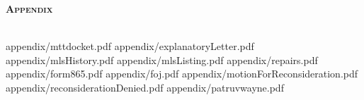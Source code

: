 \documentclass[12pt,\documentclassflag]{article}
\begin{document}
\newpage 

\begin{centering}
  \bf\scshape Appendix \\~\\
  \rm 
\end{centering}

\tableofcontents
\newpage
\renewcommand{\footrulewidth}{0.4pt}
\renewcommand{\subsectionmark}[1]{\markright{/#1}} %

\newcommand{\addLabelsToAllIncludedPages}[1]{%
   \refstepcounter{includepdfpage}%
   \stepcounter{currentpagecounter}%
   \label{#1.\thecurrentpagecounter}}%

\newcommand{\myincludepdf}[2]{%
  \setcounter{currentpagecounter}{0}%
  {appendix/#1.pdf}}%
  
\renewcommand{\sectionmark}[1]{\markboth{#1}{}} %
\myincludepdf{mttdocket}{1,section, 1, Tax Tribunal Docket}
\renewcommand{\sectionmark}[1]{\markboth{#1}{/Explanatory Letter}} %
\myincludepdf{explanatoryLetter}{1,section,1,Submitted Evidence,evidence,1,subsection,2,Explanatory Letter}
\myincludepdf{mlsHistory}{1,subsection,2,MLS History}
\myincludepdf{mlsListing}{1,subsection,2,MLS Listing Sheet}
\myincludepdf{repairs}{1,subsection,2,List of Repairs}
\myincludepdf{form865}{1,subsection,2,Form 865 Mathieu Gast Nonconsideration}
\renewcommand{\sectionmark}[1]{\markboth{#1}{}} %
\myincludepdf{foj}{1,section,1,Final Opinion and Judgement}
\myincludepdf{motionForReconsideration}{1,section,1,Motion For Reconsideration}
\myincludepdf{reconsiderationDenied}{1,section,1,Reconsideration Denied}
\myincludepdf{patruvwayne}{1,section,1,Patru v Wayne}

\newpage\empty%
\end{document}
